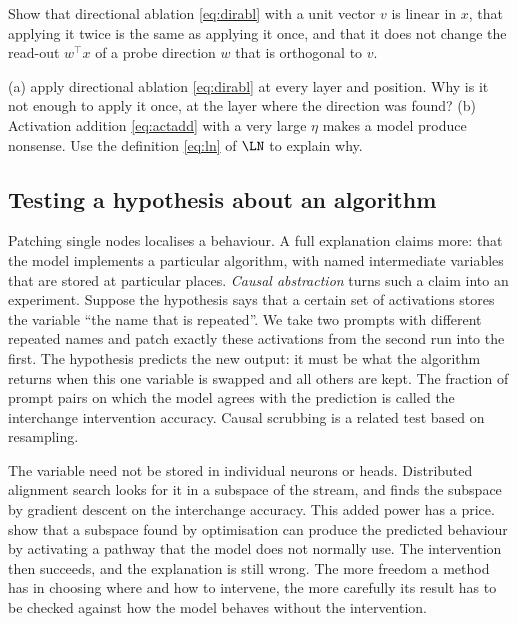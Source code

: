 \begin{exercise}\label{ex:projection}
Show that directional ablation \eqref{eq:dirabl} with a unit vector $v$ is linear in $x$, that applying it twice
is the same as applying it once, and that it does not change the read-out $w^\top x$ of a probe direction $w$
that is orthogonal to $v$.
\end{exercise}

\begin{exercise}\label{ex:everylayer}
(a) \citet{arditi2024refusal} apply directional ablation \eqref{eq:dirabl} at every layer and position. Why is it
not enough to apply it once, at the layer where the direction was found? (b) Activation addition
\eqref{eq:actadd} with a very large $\eta$ makes a model produce nonsense. Use the definition \eqref{eq:ln} of
$\LN$ to explain why.
\end{exercise}

\subsection{Testing a hypothesis about an algorithm}
\label{sec:abstraction}

Patching single nodes localises a behaviour. A full explanation claims more: that the model implements a
particular algorithm, with named intermediate variables that are stored at particular places. \emph{Causal
abstraction} \citep{geiger2021causal,geiger2025causal} turns such a claim into an experiment. Suppose the
hypothesis says that a certain set of activations stores the variable ``the name that is repeated''. We take two
prompts with different repeated names and patch exactly these activations from the second run into the first.
The hypothesis predicts the new output: it must be what the algorithm returns when this one variable is swapped
and all others are kept. The fraction of prompt pairs on which the model agrees with the prediction is called
the interchange intervention accuracy. Causal scrubbing \citep{chan2022causal} is a related test based on
resampling.

The variable need not be stored in individual neurons or heads. Distributed alignment search
\citep{geiger2024finding} looks for it in a subspace of the stream, and finds the subspace by gradient descent on
the interchange accuracy. This added power has a price. \citet{makelov2024subspace} show that a subspace found
by optimisation can produce the predicted behaviour by activating a pathway that the model does not normally
use. The intervention then succeeds, and the explanation is still wrong. The more freedom a method has in
choosing where and how to intervene, the more carefully its result has to be checked against how the model
behaves without the intervention.


